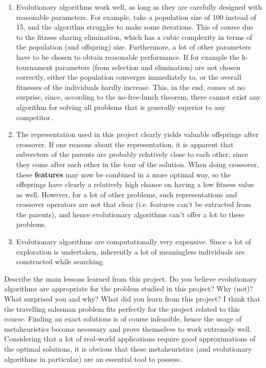 \documentclass[a4paper,10pt]{article}
\newcommand{\ReplaceMe}[1]{{\color{blue}#1}}
\begin{document}
\begin{enumerate}
 \item Evolutionary algorithms work well, as long as they are carefully designed with reasonable parameters. For example, take a population size of 100 instead of 15, and the algorithm struggles to make some iterations. This of course due to the fitness sharing elimination, which has a cubic complexity in terms of the population (and offspring) size. Furthermore, a lot of other parameters have to be chosen to obtain reasonable performance. If for example the k-tournament parameters (from selection and elimination) are not chosen correctly, either the population converges immediately to, or the overall fitnesses of the individuals hardly increase. This, in the end, comes at no surprise, since, according to the no-free-lunch theorem, there cannot exist any algorithm for solving all problems that is generally superior to any competitor.
 \item The representation used in this project clearly yields valuable offsprings after crossover. If one reasons about the representation, it is apparent that subvectors of the parents are probably relatively close to each other, since they come after each other in the tour of the solution. When doing crossover, these \textbf{features} may now be combined in a more optimal way, so the offsprings have clearly a relatively high chance on having a low fitness value as well. However, for a lot of other problems, such representations and crossover operators are not that clear (i.e. features can't be extracted from the parents), and hence evolutionary algorithms can't offer a lot to these problems. 
 \item Evolutionary algorithms are computationally very expensive. Since a lot of exploration is undertaken, inherently a lot of meaningless individuals are constructed while searching.
\end{enumerate}

\ReplaceMe{Describe the main lessons learned from this project. Do you believe evolutionary algorithms are appropriate for the problem studied in this project? Why (not)? What surprised you and why? What did you learn from this project?}
I think that the travelling salesman problem fits perfectly for the project related to this course. Finding an exact solutions is of course infeasible, hence the usage of metaheuristics become necessary and prove themselves to work extremely well. Considering that a lot of real-world applications require good approximations of the optimal solutions, it is obvious that these metaheuristics (and evolutionary algorithms in particular) are an essential tool to possess.
\end{document}
